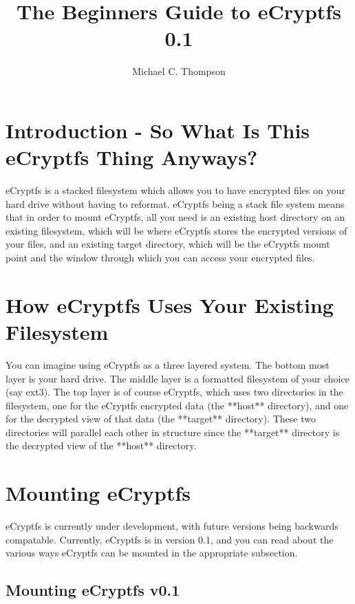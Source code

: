 \documentclass{article}
\newcommand{\currentversion}{0.1}
\begin{document}
\title{The Beginners Guide to eCryptfs \currentversion}

\author{Michael C. Thompson}

\maketitle

\section*{Introduction - So What Is This eCryptfs Thing Anyways?}

eCryptfs is a stacked filesystem which allows you to have encrypted files on
your hard drive without having to reformat. eCryptfs being a stack file system
means that in order to mount eCryptfs, all you need is an existing host
directory on an existing filesystem, which will be where eCryptfs stores the
encrypted versions of your files, and an existing target directory, which will
be the eCryptfs mount point and the window through which you can access your
encrypted files.

\section*{How eCryptfs Uses Your Existing Filesystem}

You can imagine using eCryptfs as a three layered system. The bottom most
layer is your hard drive. The middle layer is a formatted filesystem of your
choice (say ext3). The top layer is of course eCryptfs, which uses two
directories in the filesystem, one for the eCryptfs encrypted data (the
**host** directory), and one for the decrypted view of that data (the **target**
directory). These two directories will parallel each other in structure since
the **target** directory is the decrypted view of the **host** directory.

\section*{Mounting eCryptfs}

eCryptfs is currently under development, with future versions being
backwards compatable. Currently, eCryptfs is in version 0.1, and you can
read about the various ways eCryptfs can be mounted in the appropriate
subsection.

\subsection*{Mounting eCryptfs v0.1}
\end{document}
